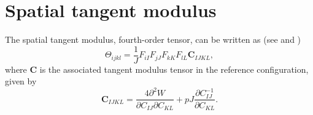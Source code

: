 



\section{Spatial tangent modulus}
\label{sec:incremental_spatial}
\label{appendix}
The spatial tangent modulus, fourth-order tensor, can be written as  (see \cite[section 5.3.2]{bonet1997nonlinear} and \cite[section 6.6]{holzapfel2000mechanics} )  
\begin{equation}
{\Theta}_{ijkl}= \frac{1}{J}F_{iI}F_{jJ}F_{kK}F_{lL}\mathbf{C}_{IJKL},
\label{incremental_spatial}
\end{equation}
where ${\mathbf{C}}$ is the associated tangent modulus tensor in the reference configuration, given by
\begin{equation}
{\mathbf{C}}_{IJKL}= \frac{4 \partial^{2} W}{\partial C_{IJ} \partial C_{KL} } + pJ \frac{\partial {C}^{-1}_{IJ}}{\partial {C}_{KL}}.
\end{equation}

